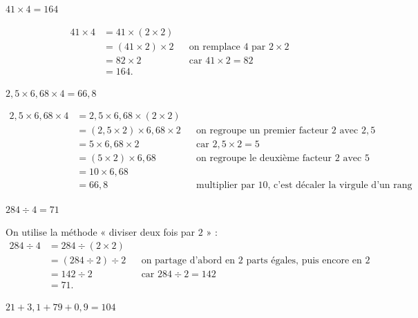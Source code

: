 \documentclass[answers]{exam}
\begin{document}
\begin{questions}

  \question $41 \times 4 = \boxed{164}$

  \begin{solution}
  \begin{align*}
    41 \times 4 
      &= 41 \times (2 \times 2) \\
      &= (41 \times 2) \times 2 &&\text{on remplace $4$ par $2 \times 2$} \\
      &= 82 \times 2 &&\text{car } 41 \times 2 = 82 \\
      &= 164.
  \end{align*}
  \end{solution}

  \question $2{,}5 \times 6{,}68 \times 4 = \boxed{66{,}8}$

  \begin{solution}
  \begin{align*}
    2{,}5 \times 6{,}68 \times 4
      &= 2{,}5 \times 6{,}68 \times (2 \times 2) \\
      &= (2{,}5 \times 2) \times 6{,}68 \times 2 &&\text{on regroupe un premier facteur $2$ avec $2{,}5$} \\
      &= 5 \times 6{,}68 \times 2 &&\text{car } 2{,}5 \times 2 = 5 \\
      &= (5 \times 2) \times 6{,}68 &&\text{on regroupe le deuxième facteur $2$ avec $5$} \\
      &= 10 \times 6{,}68 \\
      &= 66{,}8 &&\text{multiplier par $10$, c'est décaler la virgule d'un rang vers la droite.}
  \end{align*}
  \end{solution}

  \question $284 \div 4 = \boxed{71}$

  \begin{solution}
  On utilise la méthode « diviser deux fois par $2$ » :
  \begin{align*}
    284 \div 4 
      &= 284 \div (2 \times 2) \\
      &= (284 \div 2) \div 2 &&\text{on partage d'abord en $2$ parts égales, puis encore en $2$} \\
      &= 142 \div 2 &&\text{car } 284 \div 2 = 142 \\
      &= 71.
  \end{align*}
  \end{solution}

  \question $21 + 3{,}1 + 79 + 0{,}9 = \boxed{104}$


\end{questions}
\end{document}
